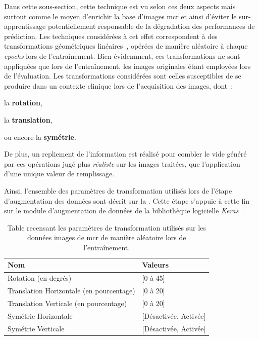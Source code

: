 Dans cette sous-section, cette technique est vu selon ces deux aspects mais surtout comme le moyen d'enrichir la base d'images \gls{mcr} et ainsi d'éviter le sur-apprentissage potentiellement responsable de la dégradation des performances de prédiction. Les techniques considérées à cet effet correspondent à des transformations géométriques linéaires~\cite{Taylor2018}, opérées de manière aléatoire à chaque \textit{epochs} lors de l'entraînement. Bien évidemment, ces transformations ne sont appliquées que lors de l'entraînement, les images originales étant employées lors de l'évaluation. Les transformations considérées sont celles susceptibles de se produire dans un contexte clinique lors de l'acquisition des images, dont~:
\begin{inlinerate}
    \item la \textbf{rotation},
    \item la \textbf{translation},
    \item ou encore la \textbf{symétrie}.
\end{inlinerate} De plus, un repliement de l'information est réalisé pour combler le vide généré par ces opérations jugé plus \textit{réaliste} sur les images traitées, que l'application d'une unique valeur de remplissage.\par

Ainsi, l'ensemble des paramètres de transformation utilisés lors de l'étape d'augmentation des données sont décrit sur la . Cette étape s'appuie à cette fin sur le module d'augmentation de données de la bibliothèque logicielle \textit{Keras}~\cite{chollet2015}.\par

\begin{table}[H]
    \centering
    \begin{tabular}{ll}
        \toprule
        \textbf{Nom}                            & \textbf{Valeurs}      \\ \midrule
        Rotation (en degrés)                    & [0 à 45]              \\ 
        Translation Horizontale (en pourcentage)& [0 à 20]              \\ 
        Translation Verticale (en pourcentage)  & [0 à 20]              \\  
        Symétrie Horizontale                    & [Désactivée, Activée]  \\  
        Symétrie Verticale                      & [Désactivée, Activée]  \\ 
        \bottomrule 
    \end{tabular} 
    \caption{Table recensant les paramètres de transformation utilisés sur les données images de \gls{mcr} de manière aléatoire lors de l'entraînement.}
    \label{tab:parameters_image_improvement_data_augmentation}
\end{table}\par

